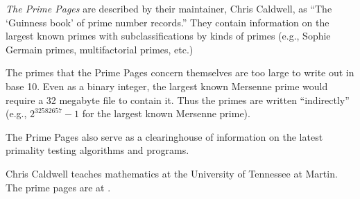 \documentclass[12pt]{article}
\begin{document}
{\em The Prime Pages} are described by their maintainer, Chris Caldwell, as ``The `Guinness book' of prime number records.'' They contain information on the largest known primes with subclassifications by kinds of primes (e.g., Sophie Germain primes, multifactorial primes, etc.)

The primes that the Prime Pages concern themselves are too large to write out in base 10. Even as a binary integer, the largest known Mersenne prime would require a 32 megabyte file to contain it. Thus the primes are written ``indirectly'' (e.g., $2^{32582657} - 1$ for the largest known Mersenne prime).

The Prime Pages also serve as a clearinghouse of information on the latest primality testing algorithms and programs.

Chris Caldwell teaches mathematics at the University of Tennessee at Martin. The prime pages are at .
\end{document}
